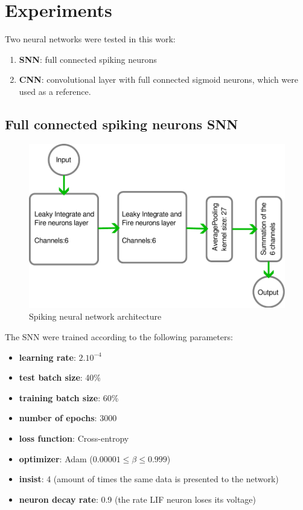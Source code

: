 \section{Experiments}
	\label{sec:experiments}
	\par Two neural networks were tested in this work:
	\begin{enumerate}
		\item \label{itm:snn} \textbf{SNN}: full connected spiking neurons
		\item \label{itm:cnn} \textbf{CNN}: convolutional layer with full connected sigmoid neurons, which were used as a reference.
	\end{enumerate}

	\subsection{Full connected spiking neurons SNN}
	\begin{figure}[H]
		\centering
		\includegraphics[width=.6\linewidth]{images/architectureSNN}
		\caption{Spiking neural network architecture}
		\label{fig:architecturesnn}
	\end{figure}
	\begin{multicols}{2}
		\par The SNN were trained according to the following parameters:
		\begin{itemize}
			\item \textbf{learning rate}: $2.10^{-4}$
			\item \textbf{test batch size}: 40\%
			\item \textbf{training batch size}: 60\%
			\item \textbf{number of epochs}: 3000
			\item \textbf{loss function}: Cross-entropy
			\item \textbf{optimizer}: Adam ($0.00001 \leq \beta \leq 0.999$)
			\item \textbf{insist}: 4 (amount of times the same data is presented to the network)
			\item \textbf{neuron decay rate}: 0.9 (the rate LIF neuron loses its voltage)
		\end{itemize}
	\columnbreak	
		
	\end{multicols}


